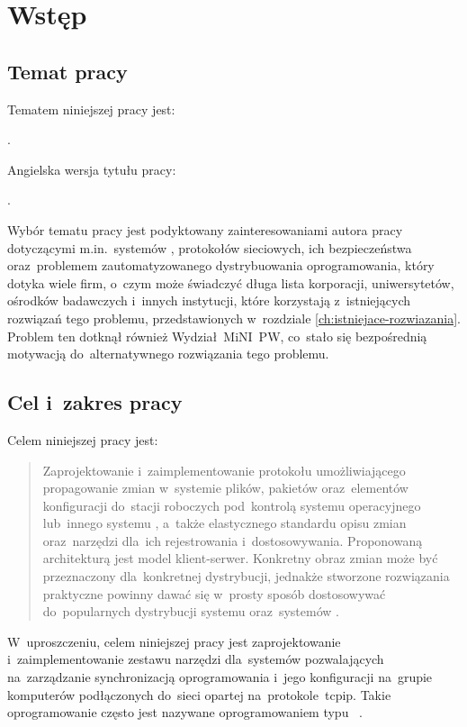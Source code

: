 \documentclass[thesis]{subfiles}
\makeatletter
\let\inserttitle\@title
\let\inserttitleaux\@titleaux
\makeatother
\begin{document}
\chapter{Wstęp}


\section{Temat pracy}

\noindent Tematem niniejszej pracy jest:
\begin{displayquote}
\inserttitle.
\end{displayquote}
Angielska wersja tytułu pracy:
\begin{displayquote}
\inserttitleaux.
\end{displayquote}
Wybór tematu pracy jest podyktowany zainteresowaniami autora pracy dotyczącymi m.in.~systemów , protokołów sieciowych, ich bezpieczeństwa oraz~problemem zautomatyzowanego dystrybuowania oprogramowania, który dotyka wiele firm, o~czym może świadczyć długa lista korporacji, uniwersytetów, ośrodków badawczych i~innych instytucji, które korzystają z~istniejących rozwiązań tego problemu, przedstawionych w~rozdziale \ref{ch:istniejace-rozwiazania}. Problem ten dotknął również Wydział~MiNI~PW, co~stało się bezpośrednią motywacją do~alternatywnego rozwiązania tego problemu.


\section{Cel i~zakres pracy}
\label{sec:cel-i-zakres}

\noindent Celem niniejszej pracy jest:
\blockcquote{formularz-zgloszenia-pracy}{Zaprojektowanie i~zaimplementowanie protokołu umożliwiającego propagowanie zmian w~systemie plików, pakietów oraz~elementów konfiguracji do~stacji roboczych pod~kontrolą systemu operacyjnego  lub~innego systemu , a~także elastycznego standardu opisu zmian oraz~narzędzi dla~ich rejestrowania i~dostosowywania. Proponowaną architekturą jest model klient-serwer. Konkretny obraz zmian może być przeznaczony dla~konkretnej dystrybucji, jednakże stworzone rozwiązania praktyczne powinny dawać się w~prosty sposób dostosowywać do~popularnych dystrybucji systemu  oraz~systemów .}
W~uproszczeniu, celem niniejszej pracy jest zaprojektowanie i~zaimplementowanie zestawu narzędzi dla~systemów  pozwalających na~zarządzanie synchronizacją oprogramowania i~jego konfiguracji na~grupie komputerów podłączonych do~sieci opartej na~protokole~\gls{tcpip}. Takie oprogramowanie często jest nazywane oprogramowaniem typu ~\cite{wiki:scm}.
\end{document}
